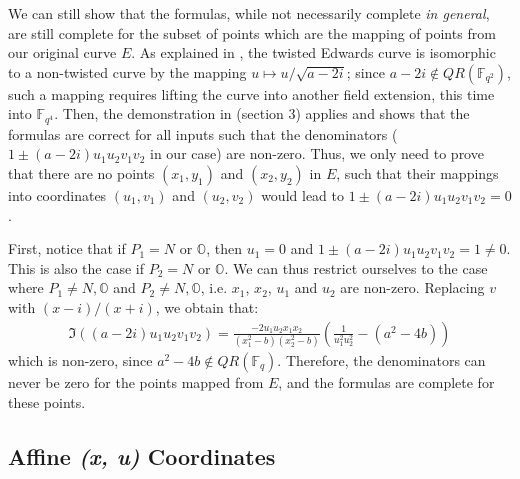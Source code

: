 \documentclass{llncs}
\newcommand{\QR}{QR}
\newcommand{\bF}{\mathbb{F}}
\newcommand{\neutral}{\mathbb{O}}
\begin{document}
We can still show that the formulas, while not necessarily complete
\emph{in general}, are still complete for the subset of points which are
the mapping of points from our original curve $E$. As explained in
\cite{BerBirJoyLanPet2008}, the twisted Edwards curve is isomorphic to a
non-twisted curve by the mapping $u \mapsto u/\sqrt{a - 2i}$; since $a -
2i \notin \QR(\bF_{q^2})$, such a mapping requires lifting the curve
into another field extension, this time into $\bF_{q^4}$. Then, the
demonstration in \cite{BerLan2007} (section 3) applies and shows that
the formulas are correct for all inputs such that the denominators ($1
\pm (a - 2i) u_1 u_2 v_1 v_2$ in our case) are non-zero. Thus, we only
need to prove that there are no points $(x_1, y_1)$ and $(x_2, y_2)$ in
$E$, such that their mappings into coordinates $(u_1, v_1)$ and $(u_2,
v_2)$ would lead to $1 \pm (a - 2i) u_1 u_2 v_1 v_2 = 0$.

First, notice that if $P_1 = N$ or $\neutral$, then $u_1 = 0$ and $1 \pm
(a - 2i) u_1 u_2 v_1 v_2 = 1 \neq 0$. This is also the case if $P_2 = N$
or $\neutral$. We can thus restrict ourselves to the case where $P_1
\neq N, \neutral$ and $P_2 \neq N, \neutral$, i.e. $x_1$, $x_2$, $u_1$
and $u_2$ are non-zero. Replacing $v$ with $(x-i)/(x+i)$, we obtain that:
\begin{align*}
    \Im((a - 2i) u_1 u_2 v_1 v_2) = \frac{-2 u_1 u_2 x_1 x_2}{(x_1^2 - b)(x_2^2 - b)}\left(\frac{1}{u_1^2 u_2^2} - (a^2 - 4b)\right)
\end{align*}
which is non-zero, since $a^2 - 4b \notin \QR(\bF_q)$. Therefore, the
denominators can never be zero for the points mapped from $E$, and the
formulas are complete for these points.

\subsection{Affine \emph{(x, u)} Coordinates}\label{sec:formulas:xu}
\end{document}

